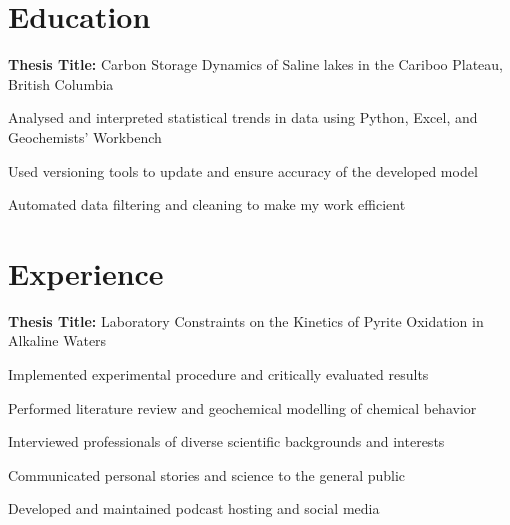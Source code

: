 \documentclass[]{deedy-resume-openfont}
\begin{document}
    
%
%
%
%
\section{Education}
\textbf{Thesis Title:} Carbon Storage Dynamics of Saline lakes in the Cariboo Plateau, British Columbia

\begin{tightemize}
\item Analysed and interpreted statistical trends in data using Python, Excel, and Geochemists’ Workbench
\item Used versioning tools to update and ensure accuracy of the developed model
\item Automated data filtering and cleaning to make my work efficient
\end{tightemize}
\sectionsep
%
%
\section{Experience}
\textbf{Thesis Title:} Laboratory Constraints on the Kinetics of Pyrite Oxidation in Alkaline Waters
\begin{tightemize}
\item Implemented experimental procedure and critically evaluated results
\item Performed literature review and geochemical modelling of chemical behavior 
\end{tightemize}


\sectionsep

\begin{tightemize}
\item Interviewed professionals of diverse scientific backgrounds and interests
\item Communicated personal stories and science to the general public 
\item Developed and maintained podcast hosting and social media
\end{tightemize}
\sectionsep
\end{document}
